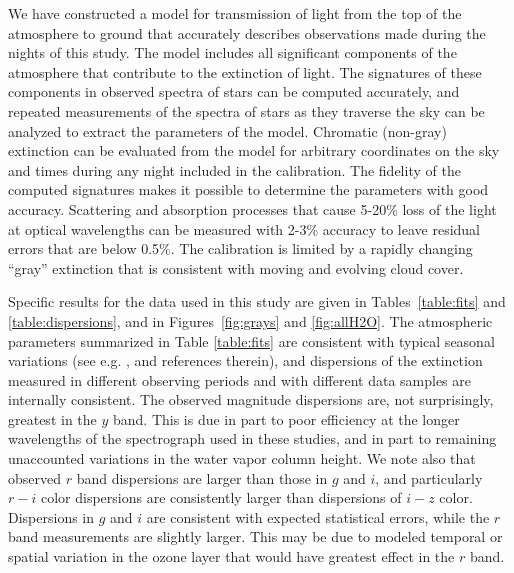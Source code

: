 \documentclass[manuscript]{aastex}
\begin{document}
We have constructed a model for transmission of light from the top of the atmosphere to ground that accurately describes observations made during 
the nights of this study.
The model includes all significant components of the atmosphere that contribute to the extinction of light.
The signatures of these components in observed spectra of stars can be computed accurately,
and repeated measurements of the spectra of stars as they traverse the sky can be analyzed to extract the parameters of the model.
Chromatic (non-gray) extinction can be evaluated from the model for arbitrary coordinates on the sky and times during any night included in the calibration.
The fidelity of the computed signatures makes it possible to determine the parameters with good accuracy.
Scattering and absorption processes that cause 5-20\% loss of the light at optical wavelengths can be measured with 2-3\% accuracy to leave
residual errors that are below 0.5\%.
The calibration is limited by a rapidly changing ``gray'' extinction that is consistent with moving and evolving cloud cover.
 
Specific results for the data used in this study are given in Tables~\ref{table:fits} and \ref{table:dispersions},
and in Figures~\ref{fig:grays} and \ref{fig:allH2O}.
The atmospheric parameters summarized in Table \ref{table:fits} are consistent with typical seasonal variations
(see e.g. \cite{stubbs07}, and references therein),
and dispersions of the extinction measured in different observing periods and with different data samples are internally consistent.
The observed magnitude dispersions are, not surprisingly, greatest in the $y$ band.
This is due in part to poor efficiency at the longer wavelengths of the spectrograph used in these studies, 
and in part to remaining unaccounted variations in the water vapor column height.
We note also that observed $r$ band dispersions are larger than those in $g$ and $i$,
and particularly $r-i$ color dispersions are consistently larger than dispersions of $i-z$ color.
Dispersions in $g$ and $i$ are consistent with expected statistical errors, while the $r$ band measurements are slightly larger.
This may be due to modeled temporal or spatial variation in the ozone layer that would have greatest effect in the $r$ band.

\end{document}
